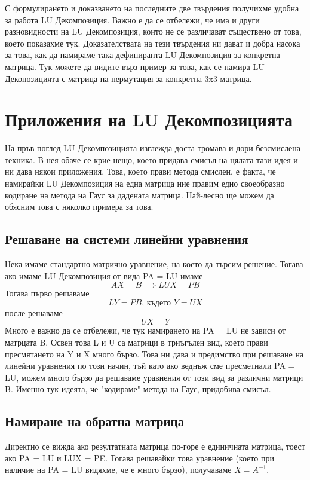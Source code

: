 \documentclass{article}
\begin{document}
С формулирането и доказването на последните две твърдения получихме удобна за работа LU Декомпозиция. Важно е да се отбележи, че има и други разновидности на LU Декомпозиция, които не се различават съществено от това, което показахме тук. Доказателствата на тези твърдения ни дават и добра насока за това, как да намираме така дефиниранта LU Декомпозиция за конкретна матрица. \href{https://www.youtube.com/watch?v=JSvxrHBZ8kE}{Тук} можете да видите върз пример за това, как се намира LU Декопозицията с матрица на пермутация за конкретна 3x3 матрица.









\section{Приложения на LU Декомпозицията}
На пръв поглед LU Декомпозицията изглежда доста тромава и дори безсмислена техника. В нея обаче се крие нещо, което придава смисъл на цялата тази идея и ни дава някои приложения. Това, което прави метода смислен, е факта, че намирайки LU Декомпозиция на една матрица ние правим едно своеобразно кодиране на метода на Гаус за дадената матрица. Най-лесно ще можем да обясним това с няколко примера за това.
\subsection{Решаване на системи линейни уравнения}
Нека имаме стандартно матрично уравнение, на което да търсим решение. Тогава ако имаме LU Декомпозиция от вида PA = LU имаме \[AX = B \implies LUX = PB\] Тогава първо решаваме \[LY = PB \text{, където } Y = UX \] после решаваме \[UX = Y\] Много е важно да се отбележи, че тук намирането на PA = LU не зависи от матрцата B. Освен това L и U са матрици в триъгълен вид, което прави пресмятането на Y и X много бързо. Това ни дава и предимство при решаване на линейни уравнения по този начин, тъй като ако веднъж сме пресметнали PA = LU, можем много бързо да решаваме уравнения от този вид за различни матрици B. Именно тук идеята, че "кодираме" метода на Гаус, придобива смисъл.
\subsection{Намиране на обратна матрица}
Директно се вижда ако резултатната матрица по-горе е единичната матрица, тоест ако PA = LU и LUX = PE. Тогава решавайки това уравнение (което при наличие на PA = LU видяхме, че е много бързо), получаваме $X = A^{-1}$.
\end{document}
